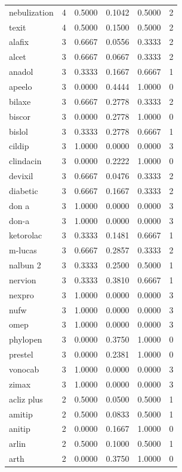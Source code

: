 \begin{longtable}{p{3.0cm}rrrrr}
nebulization & 4 & 0.5000 & 0.1042 & 0.5000 & 2 \\
texit & 4 & 0.5000 & 0.1500 & 0.5000 & 2 \\
alafix & 3 & 0.6667 & 0.0556 & 0.3333 & 2 \\
alcet & 3 & 0.6667 & 0.0667 & 0.3333 & 2 \\
anadol & 3 & 0.3333 & 0.1667 & 0.6667 & 1 \\
apeelo & 3 & 0.0000 & 0.4444 & 1.0000 & 0 \\
bilaxe & 3 & 0.6667 & 0.2778 & 0.3333 & 2 \\
biscor & 3 & 0.0000 & 0.2778 & 1.0000 & 0 \\
bislol & 3 & 0.3333 & 0.2778 & 0.6667 & 1 \\
cildip & 3 & 1.0000 & 0.0000 & 0.0000 & 3 \\
clindacin & 3 & 0.0000 & 0.2222 & 1.0000 & 0 \\
devixil & 3 & 0.6667 & 0.0476 & 0.3333 & 2 \\
diabetic & 3 & 0.6667 & 0.1667 & 0.3333 & 2 \\
don a & 3 & 1.0000 & 0.0000 & 0.0000 & 3 \\
don-a & 3 & 1.0000 & 0.0000 & 0.0000 & 3 \\
ketorolac & 3 & 0.3333 & 0.1481 & 0.6667 & 1 \\
m-lucas & 3 & 0.6667 & 0.2857 & 0.3333 & 2 \\
nalbun 2 & 3 & 0.3333 & 0.2500 & 0.5000 & 1 \\
nervion & 3 & 0.3333 & 0.3810 & 0.6667 & 1 \\
nexpro & 3 & 1.0000 & 0.0000 & 0.0000 & 3 \\
nufw & 3 & 1.0000 & 0.0000 & 0.0000 & 3 \\
omep & 3 & 1.0000 & 0.0000 & 0.0000 & 3 \\
phylopen & 3 & 0.0000 & 0.3750 & 1.0000 & 0 \\
prestel & 3 & 0.0000 & 0.2381 & 1.0000 & 0 \\
vonocab & 3 & 1.0000 & 0.0000 & 0.0000 & 3 \\
zimax & 3 & 1.0000 & 0.0000 & 0.0000 & 3 \\
acliz plus & 2 & 0.5000 & 0.0500 & 0.5000 & 1 \\
amitip & 2 & 0.5000 & 0.0833 & 0.5000 & 1 \\
anitip & 2 & 0.0000 & 0.1667 & 1.0000 & 0 \\
arlin & 2 & 0.5000 & 0.1000 & 0.5000 & 1 \\
arth & 2 & 0.0000 & 0.3750 & 1.0000 & 0 \\

\end{longtable}
